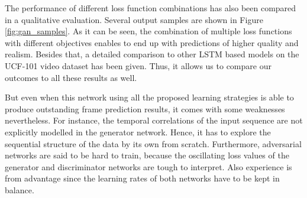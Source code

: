 The performance of different loss function combinations has also been compared in a qualitative evaluation. Several output samples are shown in Figure \ref{fig:gan_samples}. As it can be seen, the combination of multiple loss functions with different objectives enables to end up with predictions of higher quality and realism. Besides that, a detailed comparison to other LSTM based models on the UCF-101 video dataset has been given. Thus, it allows us to compare our outcomes to all these results as well.

But even when this network using all the proposed learning strategies is able to produce outstanding frame prediction results, it comes with some weaknesses nevertheless. For instance, the temporal correlations of the input sequence are not explicitly modelled in the generator network. Hence, it has to explore the sequential structure of the data by its own from scratch. Furthermore, adversarial networks are said to be hard to train, because the oscillating loss values of the generator and discriminator networks are tough to interpret. Also experience is from advantage since the learning rates of both networks have to be kept in balance.
